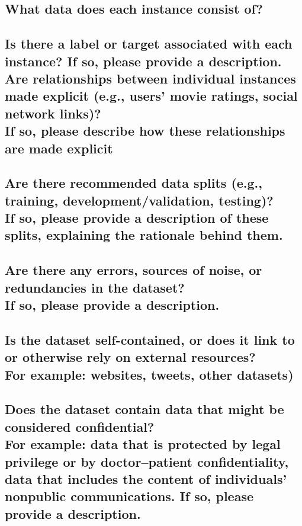 \documentclass[letterpaper, 10 pt, conference]{ieeeconf}  %
\newcommand{\subtitle}[1]{{\\ \small \normalfont \color{purple} #1}}
\begin{document}
\lipsum[1]

\subsection{What data does each instance consist of?}

\lipsum[1]

\subsection{Is there a label or target associated with each instance? If so, please provide a description. Are relationships between individual instances made explicit (e.g., users’ movie ratings, social network links)? \subtitle{If so, please describe how these relationships are made explicit}}

\lipsum[1]

\subsection{Are there recommended data splits (e.g., training, development/validation, testing)? \subtitle{If so, please provide a description of these splits, explaining the rationale behind them.}}

\lipsum[1]

\subsection{Are there any errors, sources of noise, or redundancies in the dataset? \subtitle{If so, please provide a description.}}

\lipsum[1]

\subsection{Is the dataset self-contained, or does it link to or otherwise rely on external resources? \subtitle{For example: websites, tweets, other datasets)}}

\lipsum[1]

\subsection{Does the dataset contain data that might be considered confidential? \subtitle{For example: data that is protected by legal privilege or by doctor–patient confidentiality, data that includes the content of individuals’ nonpublic communications. If so, please provide a description.}}
\end{document}
